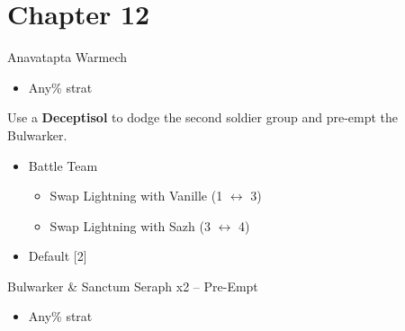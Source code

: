 \chapter{Chapter 12}

\begin{battle}{Anavatapta Warmech}
	\begin{itemize}
		\item Any\% strat
	\end{itemize}
\end{battle}

Use a \textbf{Deceptisol} to dodge the second soldier group and pre-empt the Bulwarker.

\begin{menu}
	\begin{itemize}
		\item Battle Team
			\begin{itemize}
				\item Swap Lightning with Vanille (1 $\leftrightarrow$ 3)
				\item Swap Lightning with Sazh (3 $\leftrightarrow$ 4)
			\end{itemize}
		\item Default [2]
	\end{itemize}
\end{menu}

\begin{battle}{Bulwarker \& Sanctum Seraph x2 -- Pre-Empt}
	\begin{itemize}
		\item Any\% strat
	\end{itemize}
\end{battle}

